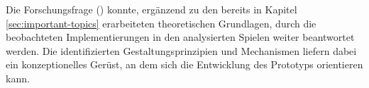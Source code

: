 Die Forschungsfrage () konnte, ergänzend zu den bereits in Kapitel \ref{sec:important-topics} erarbeiteten theoretischen Grundlagen, durch die beobachteten Implementierungen in den analysierten Spielen weiter beantwortet werden. Die identifizierten Gestaltungsprinzipien und Mechanismen liefern dabei ein  konzeptionelles Gerüst, an dem sich die Entwicklung des Prototyps orientieren kann.